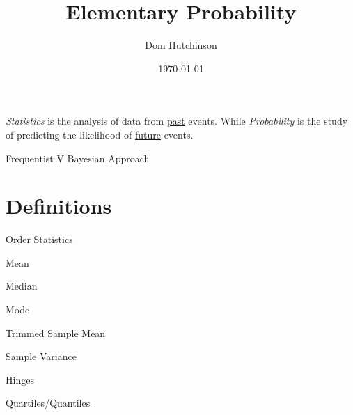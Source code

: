 \documentclass[11pt,a4paper]{article}
\begin{document}
\title{Elementary Probability}
\author{Dom Hutchinson}
\date{\today}
\maketitle

\textit{Statistics} is the analysis of data from \underline{past} events. While \textit{Probability} is the study of predicting the likelihood of \underline{future} events.

\begin{remark}{Frequentist V Bayesian Approach}
  
\end{remark}

\section{Definitions}

\begin{definition}{Order Statistics}

\end{definition}

\begin{definition}{Mean}

\end{definition}

\begin{definition}{Median}

\end{definition}

\begin{definition}{Mode}

\end{definition}

\begin{definition}{Trimmed Sample Mean}

\end{definition}

\begin{definition}{Sample Variance}

\end{definition}

\begin{definition}{Hinges}

\end{definition}

\begin{definition}{Quartiles/Quantiles}

\end{definition}
\end{document}
